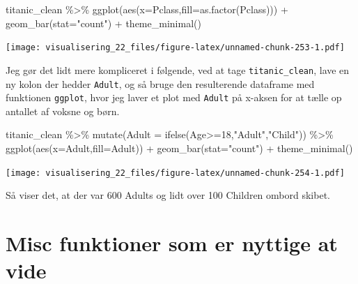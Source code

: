 \documentclass[
]{book}
\newenvironment{Shaded}{\begin{snugshade}}{\end{snugshade}}
\newcommand{\AttributeTok}[1]{\textcolor[rgb]{0.77,0.63,0.00}{#1}}
\newcommand{\DecValTok}[1]{\textcolor[rgb]{0.00,0.00,0.81}{#1}}
\newcommand{\FunctionTok}[1]{\textcolor[rgb]{0.00,0.00,0.00}{#1}}
\newcommand{\NormalTok}[1]{#1}
\newcommand{\SpecialCharTok}[1]{\textcolor[rgb]{0.00,0.00,0.00}{#1}}
\newcommand{\StringTok}[1]{\textcolor[rgb]{0.31,0.60,0.02}{#1}}
\begin{document}
\begin{Shaded}
\begin{Highlighting}[]
\NormalTok{titanic\_clean }\SpecialCharTok{\%\textgreater{}\%} 
  \FunctionTok{ggplot}\NormalTok{(}\FunctionTok{aes}\NormalTok{(}\AttributeTok{x=}\NormalTok{Pclass,}\AttributeTok{fill=}\FunctionTok{as.factor}\NormalTok{(Pclass))) }\SpecialCharTok{+} 
  \FunctionTok{geom\_bar}\NormalTok{(}\AttributeTok{stat=}\StringTok{"count"}\NormalTok{) }\SpecialCharTok{+}
  \FunctionTok{theme\_minimal}\NormalTok{()}
\end{Highlighting}
\end{Shaded}

\texttt{[image: visualisering\_22\_files/figure-latex/unnamed-chunk-253-1.pdf]}

Jeg gør det lidt mere kompliceret i følgende, ved at tage \texttt{titanic\_clean}, lave en ny kolon der hedder \texttt{Adult}, og så bruge den resulterende dataframe med funktionen \texttt{ggplot}, hvor jeg laver et plot med \texttt{Adult} på x-aksen for at tælle op antallet af voksne og børn.

\begin{Shaded}
\begin{Highlighting}[]
\NormalTok{titanic\_clean }\SpecialCharTok{\%\textgreater{}\%} 
   \FunctionTok{mutate}\NormalTok{(}\AttributeTok{Adult =} \FunctionTok{ifelse}\NormalTok{(Age}\SpecialCharTok{\textgreater{}=}\DecValTok{18}\NormalTok{,}\StringTok{"Adult"}\NormalTok{,}\StringTok{"Child"}\NormalTok{)) }\SpecialCharTok{\%\textgreater{}\%} 
   \FunctionTok{ggplot}\NormalTok{(}\FunctionTok{aes}\NormalTok{(}\AttributeTok{x=}\NormalTok{Adult,}\AttributeTok{fill=}\NormalTok{Adult)) }\SpecialCharTok{+} 
   \FunctionTok{geom\_bar}\NormalTok{(}\AttributeTok{stat=}\StringTok{"count"}\NormalTok{) }\SpecialCharTok{+} 
   \FunctionTok{theme\_minimal}\NormalTok{()}
\end{Highlighting}
\end{Shaded}

\texttt{[image: visualisering\_22\_files/figure-latex/unnamed-chunk-254-1.pdf]}

Så viser det, at der var 600 Adults og lidt over 100 Children ombord skibet.

\hypertarget{misc-funktioner-som-er-nyttige-at-vide}{%
\section{Misc funktioner som er nyttige at vide}\label{misc-funktioner-som-er-nyttige-at-vide}}
\end{document}
